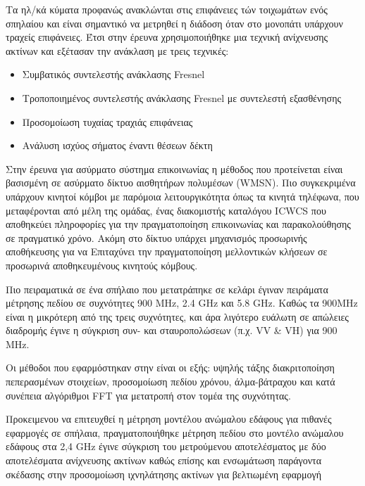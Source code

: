 \documentclass[12pt, greek]{article}
\begin{document}
\begin{multicols*}{2}
        Τα ηλ/κά κύματα προφανώς ανακλώνται στις επιφάνειες τών τοιχωμάτων ενός σπηλαίου και
        είναι σημαντικό να μετρηθεί η διάδοση όταν στο μονοπάτι υπάρχουν τραχείς επιφάνειες.
        Έτσι στην έρευνα \cite{soo_investigation_2018} χρησιμοποιήθηκε μια τεχνική ανίχνευσης 
        ακτίνων και εξέτασαν την ανάκλαση με τρεις τεχνικές:
        \begin{itemize}
            \item Συμβατικός συντελεστής ανάκλασης Fresnel
            \item Τροποποιημένος συντελεστής ανάκλασης Fresnel με συντελεστή εξασθένησης
            \item Προσομοίωση τυχαίας τραχιάς επιφάνειας
            \item Ανάλυση ισχύος σήματος έναντι θέσεων δέκτη
        \end{itemize}

        Στην έρευνα για ασύρματο σύστημα επικοινωνίας \cite{yavuz_-cave_2009} η μέθοδος που
        προτείνεται είναι βασισμένη σε ασύρματο δίκτυο αισθητήρων πολυμέσων (WMSN). Πιο
        συγκεκριμένα υπάρχουν κινητοί κόμβοι με παρόμοια λειτουργικότητα όπως τα κινητά τηλέφωνα,
        που μεταφέρονται από μέλη της ομάδας, ένας διακομιστής καταλόγου ICWCS που αποθηκεύει
        πληροφορίες για την πραγματοποίηση επικοινωνίας και παρακολούθησης σε πραγματικό χρόνο. Ακόμη
        στο δίκτυο υπάρχει μηχανισμός προσωρινής αποθήκευσης για να Επιταχύνει την πραγματοποίηση
        μελλοντικών κλήσεων σε προσωρινά αποθηκευμένους κινητούς κόμβους.
        
        Πιο πειραματικά σε ένα σπήλαιο που μετατράπηκε σε κελάρι \cite{soo_propagation_2018}
        έγιναν πειράματα μέτρησης πεδίου σε συχνότητες 900 MHz, 2.4 GHz και 5.8 GHz. Καθώς
        τα 900MHz είναι η μικρότερη από της τρεις συχνότητες, και άρα λιγότερο ευάλωτη σε 
        απώλειες διαδρομής έγινε η σύγκριση συν- και σταυροπολώσεων (π.χ. VV \& VH) για 900 MHz.
        
        Οι μέθοδοι που εφαρμόστηκαν στην \cite{pingenot_full_2005} είναι οι εξής: υψηλής τάξης
        διακριτοποίηση πεπερασμένων στοιχείων, προσομοίωση πεδίου χρόνου, άλμα-βάτραχου και
        κατά συνέπεια αλγόριθμοι FFT για μετατροπή στον τομέα της συχνότητας.

        Προκειμενου να επιτευχθεί η μέτρηση μοντέλου ανώμαλου εδάφους για πιθανές εφαρμογές
        σε σπήλαια, πραγματοποιήθηκε μέτρηση πεδίου στο μοντέλο ανώμαλου εδάφους στα 2,4 GHz
        έγινε σύγκριση του μετρούμενου αποτελέσματος με δύο αποτελέσματα ανίχνευσης ακτίνων
        καθώς επίσης και ενσωμάτωση παράγοντα σκέδασης στην προσομοίωση ιχνηλάτησης ακτίνων
        για βελτιωμένη εφαρμογή



\end{multicols*}
\end{document}
